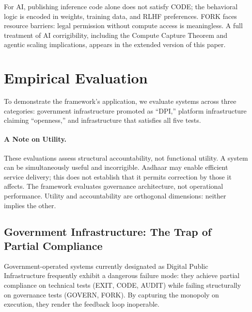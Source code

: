 \documentclass{article}
\begin{document}
For AI, publishing inference code alone does not satisfy CODE; the behavioral logic is encoded in weights, training data, and RLHF preferences. FORK faces resource barriers: legal permission without compute access is meaningless. A full treatment of AI corrigibility, including the Compute Capture Theorem and agentic scaling implications, appears in the extended version of this paper.

\section{Empirical Evaluation}
\label{sec:diagnosis}

To demonstrate the framework's application, we evaluate systems across three categories: government infrastructure promoted as ``DPI,'' platform infrastructure claiming ``openness,'' and infrastructure that satisfies all five tests.

\paragraph{A Note on Utility.} These evaluations assess structural accountability, not functional utility. A system can be simultaneously useful and incorrigible. Aadhaar may enable efficient service delivery; this does not establish that it permits correction by those it affects. The framework evaluates governance architecture, not operational performance. Utility and accountability are orthogonal dimensions: neither implies the other.

\subsection{Government Infrastructure: The Trap of Partial Compliance}

Government-operated systems currently designated as Digital Public Infrastructure frequently exhibit a dangerous failure mode: they achieve partial compliance on technical tests (EXIT, CODE, AUDIT) while failing structurally on governance tests (GOVERN, FORK). By capturing the monopoly on execution, they render the feedback loop inoperable.
\end{document}
